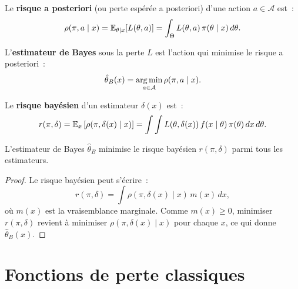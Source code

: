 \begin{definition}
Le \textbf{risque a posteriori} (ou perte esp\'er\'ee a posteriori)
d'une action $a \in \mathcal{A}$ est~:
\[
  \rho(\pi, a \mid x) = \mathbb{E}_{\theta \mid x}[L(\theta, a)]
  = \int_\Theta L(\theta, a)\,\pi(\theta \mid x)\,d\theta.
\]
\end{definition}

\begin{definition}
L'\textbf{estimateur de Bayes} sous la perte $L$ est l'action qui
minimise le risque a posteriori~:
\[
  \hat{\theta}_B(x) = \operatorname*{arg\,min}_{a \in \mathcal{A}} \rho(\pi, a \mid x).
\]
\end{definition}

\begin{definition}
Le \textbf{risque bay\'esien} d'un estimateur $\delta(x)$ est~:
\[
  r(\pi, \delta) = \mathbb{E}_x\left[\rho(\pi, \delta(x) \mid x)\right]
  = \int \int L(\theta, \delta(x))\,f(x \mid \theta)\,\pi(\theta)\,dx\,d\theta.
\]
\end{definition}

\begin{theoreme}
L'estimateur de Bayes $\hat{\theta}_B$ minimise le risque bay\'esien
$r(\pi, \delta)$ parmi tous les estimateurs.
\end{theoreme}

\begin{proof}
Le risque bay\'esien peut s'\'ecrire~:
\[
  r(\pi, \delta) = \int \rho(\pi, \delta(x) \mid x)\,m(x)\,dx,
\]
o\`u $m(x)$ est la vraisemblance marginale. Comme $m(x) \geq 0$,
minimiser $r(\pi, \delta)$ revient \`a minimiser $\rho(\pi, \delta(x) \mid x)$
pour chaque $x$, ce qui donne $\hat{\theta}_B(x)$.
\end{proof}

\section{Fonctions de perte classiques}

